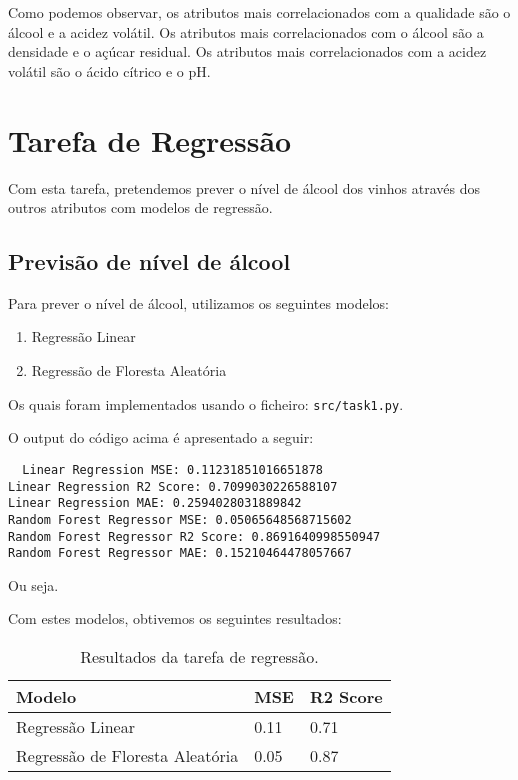 \documentclass{article}
\begin{document}
Como podemos observar, os atributos mais correlacionados com a qualidade são o álcool e a acidez volátil. Os atributos mais correlacionados com o álcool são a densidade e o açúcar residual. Os atributos mais correlacionados com a acidez volátil são o ácido cítrico e o pH.

\section{Tarefa de Regressão}

Com esta tarefa, pretendemos prever o nível de álcool dos vinhos através dos outros atributos com modelos de regressão.

\subsection{Previsão de nível de álcool}
Para prever o nível de álcool, utilizamos os seguintes modelos:

\begin{enumerate}
  \item Regressão Linear
  \item Regressão de Floresta Aleatória
\end{enumerate}

Os quais foram implementados usando o ficheiro: \texttt{src/task1.py}.

O output do código acima é apresentado a seguir:

\begin{verbatim}
  Linear Regression MSE: 0.11231851016651878
Linear Regression R2 Score: 0.7099030226588107
Linear Regression MAE: 0.2594028031889842
Random Forest Regressor MSE: 0.05065648568715602
Random Forest Regressor R2 Score: 0.8691640998550947
Random Forest Regressor MAE: 0.15210464478057667
\end{verbatim}

Ou seja.

Com estes modelos, obtivemos os seguintes resultados:

\begin{table}[ht]
  \centering
  \begin{tabular}{@{}lll@{}}
    \toprule
    Modelo & MSE & R2 Score \\ \midrule
    Regressão Linear & 0.11 & 0.71 \\
    Regressão de Floresta Aleatória & 0.05 & 0.87 \\ \bottomrule
  \end{tabular}
  \caption{Resultados da tarefa de regressão.}
  \label{tab:task1_results}
\end{table}
\end{document}
